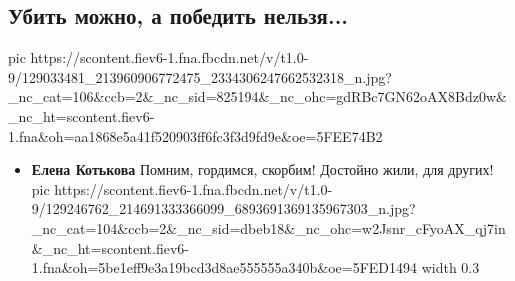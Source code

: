  
 
 
 
 

\subsection{Убить можно, а победить нельзя...}
\label{sec:01_12_2020.fb.lnrgumo.1.imena}

\ifcmt
pic https://scontent.fiev6-1.fna.fbcdn.net/v/t1.0-9/129033481_213960906772475_2334306247662532318_n.jpg?_nc_cat=106&ccb=2&_nc_sid=825194&_nc_ohc=gdRBc7GN62oAX8Bdz0w&_nc_ht=scontent.fiev6-1.fna&oh=aa1868e5a41f520903ff6fc3f3d9fd9e&oe=5FEE74B2
\fi

\begin{itemize}
\item \textbf{Елена Котькова}
Помним, гордимся, скорбим!  Достойно жили, для других!
\ifcmt
pic https://scontent.fiev6-1.fna.fbcdn.net/v/t1.0-9/129246762_214691333366099_6893691369135967303_n.jpg?_nc_cat=104&ccb=2&_nc_sid=dbeb18&_nc_ohc=w2Jsnr_cFyoAX_qj7in&_nc_ht=scontent.fiev6-1.fna&oh=5be1eff9e3a19bcd3d8ae555555a340b&oe=5FED1494
width 0.3
\fi
\end{itemize}
